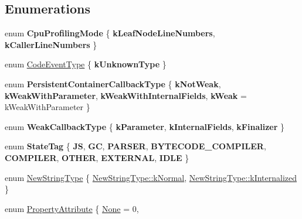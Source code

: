 \subsection*{Enumerations}
\begin{DoxyCompactItemize}
\item 
\mbox{\label{namespacev8_a57a16107c54510306c4e53f8cc5e9848}} 
enum {\bfseries Cpu\+Profiling\+Mode} \{ {\bfseries k\+Leaf\+Node\+Line\+Numbers}, 
{\bfseries k\+Caller\+Line\+Numbers}
 \}
\item 
enum \mbox{\hyperlink{namespacev8_af0ff31131cc32ced9b5279b321569bbc}{Code\+Event\+Type}} \{ {\bfseries k\+Unknown\+Type}
 \}
\item 
\mbox{\label{namespacev8_ad2a33b8f8a1701a800a691dd025f7dde}} 
enum {\bfseries Persistent\+Container\+Callback\+Type} \{ {\bfseries k\+Not\+Weak}, 
{\bfseries k\+Weak\+With\+Parameter}, 
{\bfseries k\+Weak\+With\+Internal\+Fields}, 
{\bfseries k\+Weak} = k\+Weak\+With\+Parameter
 \}
\item 
\mbox{\label{namespacev8_a68b2b90003e18980bc0b438c95be1005}} 
enum {\bfseries Weak\+Callback\+Type} \{ {\bfseries k\+Parameter}, 
{\bfseries k\+Internal\+Fields}, 
{\bfseries k\+Finalizer}
 \}
\item 
\mbox{\label{namespacev8_adb1bd0f9ef7cc084b6a94a5e1b420f69}} 
enum {\bfseries State\+Tag} \{ \newline
{\bfseries JS}, 
{\bfseries GC}, 
{\bfseries P\+A\+R\+S\+ER}, 
{\bfseries B\+Y\+T\+E\+C\+O\+D\+E\+\_\+\+C\+O\+M\+P\+I\+L\+ER}, 
\newline
{\bfseries C\+O\+M\+P\+I\+L\+ER}, 
{\bfseries O\+T\+H\+ER}, 
{\bfseries E\+X\+T\+E\+R\+N\+AL}, 
{\bfseries I\+D\+LE}
 \}
\item 
enum \mbox{\hyperlink{namespacev8_ac9163ab12fb3b2a95907a3a0367c6095}{New\+String\+Type}} \{ \mbox{\hyperlink{namespacev8_ac9163ab12fb3b2a95907a3a0367c6095a07fa7a19aa722c635a15e94cb7f50416}{New\+String\+Type\+::k\+Normal}}, 
\mbox{\hyperlink{namespacev8_ac9163ab12fb3b2a95907a3a0367c6095ade6a7f11cd845d59e52b388d18929295}{New\+String\+Type\+::k\+Internalized}}
 \}
\item 
enum \mbox{\hyperlink{namespacev8_a05f25f935e108a1ea2d150e274602b87}{Property\+Attribute}} \{ \mbox{\hyperlink{namespacev8_a05f25f935e108a1ea2d150e274602b87a7ab4d58719c33b3ea2dfaefa29b111df}{None}} = 0, 

\end{DoxyCompactItemize}
